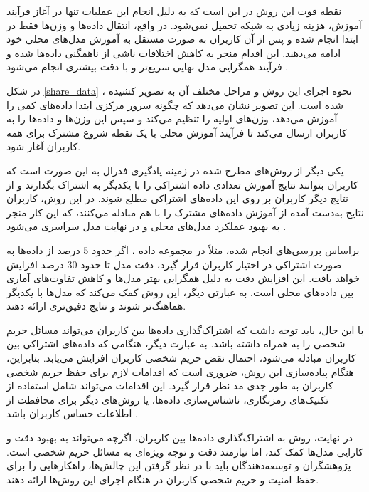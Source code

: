 نقطه قوت این روش در این است که به دلیل انجام این عملیات تنها در آغاز فرآیند آموزش، هزینه زیادی به شبکه تحمیل نمی‌شود. در واقع، انتقال داده‌ها و وزن‌ها فقط در ابتدا انجام شده و پس از آن کاربران به صورت مستقل به آموزش مدل‌های محلی خود ادامه می‌دهند. این اقدام منجر به کاهش اختلافات ناشی از ناهمگنی داده‌ها شده و فرآیند همگرایی مدل نهایی سریع‌تر و با دقت بیشتری انجام می‌شود
\cite{zhao2018federated}.

در شکل
\ref{share_data}%
، نحوه اجرای این روش و مراحل مختلف آن به تصویر کشیده شده است. این تصویر نشان می‌دهد که چگونه سرور مرکزی ابتدا داده‌های کمی را آموزش می‌دهد، وزن‌های اولیه را تنظیم می‌کند و سپس این وزن‌ها و داده‌ها را به کاربران ارسال می‌کند تا فرآیند آموزش محلی با یک نقطه شروع مشترک برای همه کاربران آغاز شود.

یکی دیگر از روش‌های مطرح شده در زمینه یادگیری فدرال به این صورت است که کاربران بتوانند نتایج آموزش تعدادی داده اشتراکی را با یکدیگر به اشتراک بگذارند و از نتایج دیگر کاربران بر روی این داده‌های اشتراکی مطلع شوند. در این روش، کاربران نتایج به‌دست آمده از آموزش داده‌های مشترک را با هم مبادله می‌کنند، که این کار منجر به بهبود عملکرد مدل‌های محلی و در نهایت مدل سراسری می‌شود
\cite{collins2021exploiting}.

براساس بررسی‌های انجام شده، مثلاً در مجموعه داده
،
اگر حدود 5 درصد از داده‌ها به صورت اشتراکی در اختیار کاربران قرار گیرد، دقت مدل تا حدود 30 درصد افزایش خواهد یافت. این افزایش دقت به دلیل همگرایی بهتر مدل‌ها و کاهش تفاوت‌های آماری بین داده‌های محلی است. به عبارتی دیگر، این روش کمک می‌کند که مدل‌ها با یکدیگر هماهنگ‌تر شوند و نتایج دقیق‌تری ارائه دهند.

با این حال، باید توجه داشت که اشتراک‌گذاری داده‌ها بین کاربران می‌تواند مسائل حریم شخصی را به همراه داشته باشد. به عبارت دیگر، هنگامی که داده‌های اشتراکی بین کاربران مبادله می‌شود، احتمال نقض حریم شخصی کاربران افزایش می‌یابد. بنابراین، هنگام پیاده‌سازی این روش، ضروری است که اقدامات لازم برای حفظ حریم شخصی کاربران به طور جدی مد نظر قرار گیرد. این اقدامات می‌تواند شامل استفاده از تکنیک‌های رمزنگاری، ناشناس‌سازی داده‌ها، یا روش‌های دیگر برای محافظت از اطلاعات حساس کاربران باشد
\cite{ma2022state}.

در نهایت، روش به اشتراک‌گذاری داده‌ها بین کاربران، اگرچه می‌تواند به بهبود دقت و کارایی مدل‌ها کمک کند، اما نیازمند دقت و توجه ویژه‌ای به مسائل حریم شخصی است. پژوهشگران و توسعه‌دهندگان باید با در نظر گرفتن این چالش‌ها، راهکارهایی را برای حفظ امنیت و حریم شخصی کاربران در هنگام اجرای این روش‌ها ارائه دهند.

